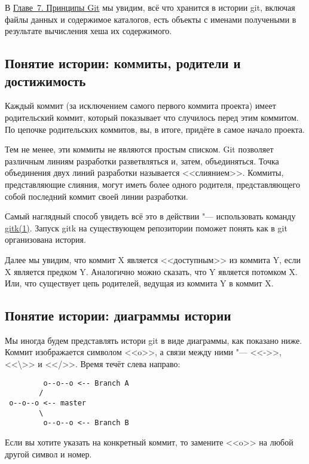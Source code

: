 \documentclass[a4paper, 11pt]{report}
\begin{document}
В \href{#chapter7}{Главе~7. Принципы Git} мы увидим, всё что хранится в истории git,
включая файлы данных и содержимое каталогов, есть объекты с именами получеными в
результате вычисления хеша их содержимого.


\subsection{Понятие истории: коммиты, родители и достижимость}

Каждый коммит (за исключением самого первого коммита проекта) имеет родительский
коммит, который показывает что случилось перед этим коммитом. По цепочке родительских
коммитов, вы, в итоге, придёте в самое начало проекта. 

Тем не менее, эти коммиты не являются простым списком. Git позволяет различным
линиям разработки разветвляться и, затем, объединяться. Точка объединения двух
линий разработки называется <<слиянием>>. Коммиты, представляющие слияния, могут
иметь более одного родителя, представляющего собой последний коммит своей линии
разработки.

Самый наглядный способ увидеть всё это в действии "--- использовать команду
\href{http://www.kernel.org/pub/software/scm/git/docs/gitk.html}{gitk(1)}. 
Запуск gitk на существующем репозитории поможет понять как в git организована
история.

Далее мы увидим, что коммит X является <<доступным>> из коммита Y, если X является
предком Y. Аналогично можно сказать, что Y является потомком X. Или, что существует
цепь родителей, ведущая из коммита Y в коммит X.


\subsection{Понятие истории: диаграммы истории}

Мы иногда будем представлять истори git в виде диаграммы, как показано ниже. Коммит
изображается символом <<o>>, а связи между ними "--- <<->>, <<\textbackslash>> и
<</>>. Время течёт слева направо:

\begin{lstlisting}
         o--o--o <-- Branch A
        /
 o--o--o <-- master
        \
         o--o--o <-- Branch B
\end{lstlisting}

Если вы хотите указать на конкретный коммит, то замените <<o>> на любой другой
символ и номер.
%
%
\end{document}
